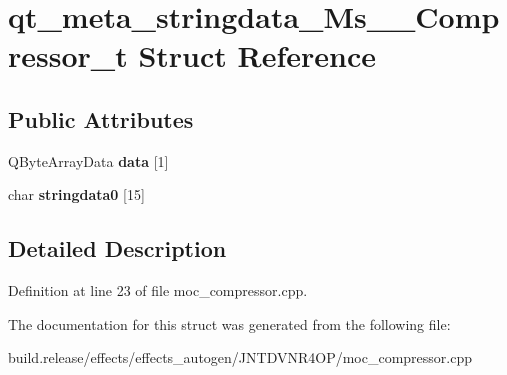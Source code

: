 \hypertarget{structqt__meta__stringdata___ms_____compressor__t}{}\section{qt\+\_\+meta\+\_\+stringdata\+\_\+\+Ms\+\_\+\+\_\+\+Compressor\+\_\+t Struct Reference}
\label{structqt__meta__stringdata___ms_____compressor__t}
\subsection*{Public Attributes}
\begin{DoxyCompactItemize}
\item 
\mbox{\label{structqt__meta__stringdata___ms_____compressor__t_aa72aeef93aec3c835b4cf8bf2999b6c5}} 
Q\+Byte\+Array\+Data {\bfseries data} \mbox{[}1\mbox{]}
\item 
\mbox{\label{structqt__meta__stringdata___ms_____compressor__t_a0eec845bac91afc594a3ec6aa5abc433}} 
char {\bfseries stringdata0} \mbox{[}15\mbox{]}
\end{DoxyCompactItemize}


\subsection{Detailed Description}


Definition at line 23 of file moc\+\_\+compressor.\+cpp.



The documentation for this struct was generated from the following file\+:\begin{DoxyCompactItemize}
\item 
build.\+release/effects/effects\+\_\+autogen/\+J\+N\+T\+D\+V\+N\+R4\+O\+P/moc\+\_\+compressor.\+cpp\end{DoxyCompactItemize}
